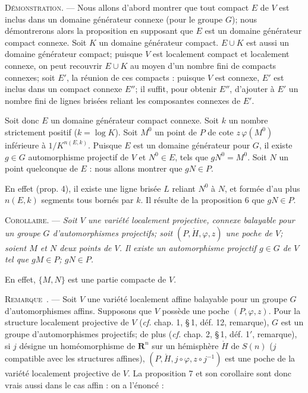 \documentclass[11pt]{article}
\newcommand{\R}{\boldsymbol{R}}
\newcommand{\bzcf}[2]{#1}
\newcommand{\bznum}[1]{\if\relax\detokenize{#1}\relax\else\ #1\fi}
\newenvironment{corollaire}{\par\medskip\noindent\textsc{Corollaire.} --- \itshape}{\par\medskip}
\newenvironment{remarque}[1][]{\par\medskip\noindent\textsc{Remarque\bznum{#1}.} --- }{\par\medskip}
\newenvironment{proof}[1][]{\par}{\par}
\begin{document}
\begin{proof}
\textsc{Démonstration.} --- Nous allons d'abord montrer que tout compact $E$ de $V$ est inclus
dans un domaine générateur connexe (pour le groupe $G$); nous
démontrerons alors la proposition en supposant que $E$ est un domaine générateur compact connexe.
Soit $K$ un domaine générateur compact. $E\cup K$ est aussi un domaine générateur compact; puisque
$V$ est localement compact et localement connexe, on peut recouvrir $E\cup K$ au moyen d'un nombre
fini de compacts connexes; soit $E'$, la réunion de ces compacts : puisque $V$ est connexe, $E'$
est inclus dans un compact connexe $E''$; il suffit, pour obtenir $E''$, d'ajouter à $E'$ un
nombre fini de lignes brisées reliant les composantes connexes de $E'$.

Soit donc $E$ un domaine générateur compact connexe. Soit $k$ un nombre strictement positif
($k=\log K$). Soit $M^0$ un point de $P$ de cote $z\,\varphi(M^0)$ inférieure à $1/K^{n(E, k)}$.
Puisque $E$ est un domaine générateur pour $G$, il existe $g\in G$ automorphisme projectif de $V$
et $N^0\in E$, tels que $gN^0=M^0$. Soit $N$ un point quelconque de $E$ : nous allons montrer que
$gN\in P$.

En effet (\bzcf{prop. 4}{\ref{bzprop:c2s2p4_ligne_brisee}}), il existe une ligne brisée $L$
reliant $N^0$ à $N$, et formée d'au plus $n(E, k)$ segments tous bornés par $k$. Il résulte de
\bzcf{la proposition 6}{\ref{bzprop:c2s2p6_ligne_brisee_poche}} que $gN\in P$.
\end{proof}

\begin{corollaire}
Soit $V$ une variété localement projective, connexe balayable pour un groupe $G$
d'automorphismes projectifs; soit $(P, \mathring{H}, \varphi, z)$ une poche de $V$; soient $M$ et
$N$ deux points de $V$. Il existe un automorphisme projectif $g\in G$ de $V$ tel que $gM\in P$;
$gN\in P$.
\end{corollaire}

\begin{proof}
En effet, $\{M, N\}$ est une partie compacte de $V$.
\end{proof}

\begin{remarque}
Soit $V$ une variété localement affine balayable pour un groupe $G$ d'automorphismes affins.
Supposons que $V$ possède une poche $(P, \varphi, z)$. Pour la structure localement projective de
$V$ (\bzcf{\textit{cf.} chap. 1, \S\,1, déf. 12,
remarque}{\ref{bzrem:c1s1r1_affine_vers_projective}}), $G$ est un groupe d'automorphismes
projectifs; de plus (\bzcf{\textit{cf.} chap. 2, \S\,1, déf. 1$'$,
remarque}{\ref{bzrem:c2s1r0_poche_affine_vers_projective}}), si $j$ désigne un homéomorphisme de
$\R^n$ sur un hémisphère $\mathring{H}$ de $S(n)$ ($j$ compatible avec les structures affines),
$(P, \mathring{H}, j\circ\varphi, z\circ j^{-1})$ est une poche de la variété localement
projective de $V$. \bzcf{La proposition 7}{\ref{bzprop:c2s2p7_compact_dans_poche}} et \bzcf{son
corollaire}{\ref{bzcor:c2s2p7c_deux_points_dans_poche}} sont donc vrais aussi dans le cas affin :
on a l'énoncé :
\end{remarque}
\end{document}
